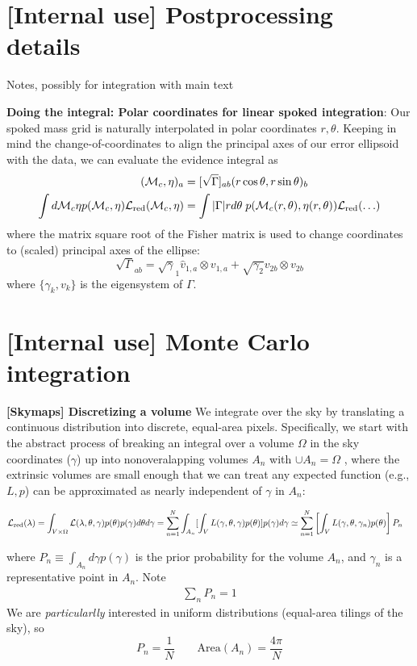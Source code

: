 \section{[Internal use] Postprocessing details}
Notes, possibly for integration with main text
\begin{widetext}

\noindent \textbf{Doing the integral: Polar coordinates for linear spoked integration}: Our spoked mass grid is
naturally interpolated in polar coordinates $r,\theta$.  Keeping in mind the change-of-coordinates to align the
principal axes of our error ellipsoid with the data, we can evaluate the evidence integral as 
\begin{align}
({{\cal M}_c},\eta)_a &= [\sqrt{\Gamma}]_{ab}  (r\cos \theta,r\sin \theta)_b \\
\int d{{\cal M}_c} \eta p({{\cal M}_c},\eta) {\cal L}_{\rm red}({{\cal M}_c},\eta) &= \int |\Gamma| r d\theta \; p({{\cal M}_c}(r,\theta),\eta(r, \theta)) {\cal L}_{\rm red}(\ldots)
\end{align}
where the matrix square root of the Fisher matrix is used to change coordinates to (scaled) principal axes of the ellipse:
\[
\sqrt{\Gamma}_{ab} = \sqrt{\gamma}_1 \hat{v}_{1,a}\otimes v_{1,a} + \sqrt{\gamma_2} v_{2b}\otimes v_{2b}
\]
where $\{\gamma_k,v_k\}$ is the eigensystem of $\Gamma$.

\end{widetext}


\section{[Internal use] Monte Carlo integration}

\noindent \textbf{[Skymaps]  Discretizing a volume} We integrate over the sky by translating a continuous distribution into
discrete, equal-area pixels.  Specifically, we start with the abstract process of breaking an integral over a volume
$\Omega$ in the sky coordinates ($\gamma$)  up into nonoveralapping
volumes $A_n$ with $\cup A_n = \Omega$  , where the extrinsic volumes are small enough that we can treat any expected
function (e.g., $L,p$) can be approximated as nearly independent of $\gamma$ in $A_n$:
\begin{widetext}
\begin{align}
{\cal L}_{\rm red}(\lambda)
& = \int_{V\times\Omega}{\cal L}(\lambda,\theta,\gamma)p(\theta)p(\gamma) d \theta d\gamma 
=  \sum_{n=1}^N \int_{A_n} [\int_V  L(\gamma,\theta,\gamma) p(\theta) ] p(\gamma)d\gamma 
 \simeq  \sum_{n=1}^N  \left [\int_V  L(\gamma,\theta,\gamma_n) p(\theta) \right] P_n 
\end{align}\end{widetext}
where $P_n \equiv \int_{A_n} d\gamma p(\gamma)$ is the prior probability for the volume $A_n$, and $\gamma_n$ is a
representative point in $A_n$.   Note
\begin{eqnarray}
\sum_n P_n =1
\end{eqnarray}
We are \emph{particularlly} interested in uniform distributions (equal-area tilings of the sky), so 
\[
P_n = \frac{1}{N} \qquad   \text{Area}(A_n) = \frac{4\pi}{N}
\]

